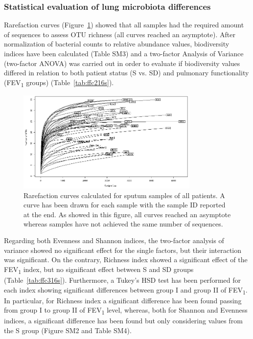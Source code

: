 \subsubsection{Statistical evaluation of lung microbiota differences}
Rarefaction curves (Figure~\ref{fig:fig316s}) showed that all samples had the required amount of sequences to assess OTU richness (all curves reached an asymptote). After normalization of bacterial counts to relative abundance values, biodiversity indices have been calculated (Table SM3) and a two-factor Analysis of Variance (two-factor ANOVA) was carried out in order to evaluate if biodiversity values differed in relation to both patient status (S vs. SD) and pulmonary functionality (FEV\textsubscript{1} groups) (Table~\ref{tab:ffc216s}). 
\begin{figure}[!tb]
	\centering
	\includegraphics[width=0.8\textwidth]{./figures/Chapter_7/Figure_3_16s}
  	\caption{\label{fig:fig316s} Rarefaction curves calculated for sputum samples of all patients. A curve has been drawn for each sample with the sample ID reported at the end. As showed in this figure, all curves reached an asymptote whereas samples have not achieved the same number of sequences.}
\end{figure}
Regarding both Evenness and Shannon indices, the two-factor analysis of variance showed no significant effect for the single factors, but their interaction was significant. On the contrary, Richness index showed a significant effect of the FEV\textsubscript{1} index, but no significant effect between S and SD groups (Table~\ref{tab:ffc316s}). Furthermore, a Tukey's HSD test has been performed for each index showing significant differences between group I and group II of FEV\textsubscript{1}. In particular, for Richness index a significant difference has been found passing from group I to group II of FEV\textsubscript{1} level, whereas, both for Shannon and Evenness indices, a significant difference has been found but only considering values from the S group (Figure SM2 and Table SM4).\\
